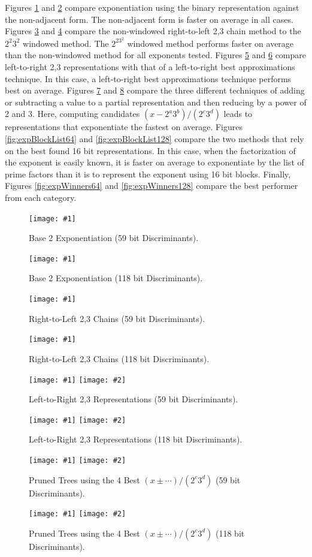 \documentclass{ucalgthes1}
\theoremstyle{definition}
\newcommand{\mygraph}[3]{
	\begin{figure}[htb]
	\centering
	\texttt{[image: \#1]}
	\caption{#3}
	\label{#2}
	\end{figure}
}
\newcommand{\mygraphTwo}[4]{
	\begin{figure}[htb]
	\centering
	\texttt{[image: \#1]}
	\texttt{[image: \#2]}
	\caption{#4}
	\label{#3}
	\end{figure}
}
\newcommand{\mygraphTwoX}[5]{
	\begin{figure}[htb]
	\centering
	\texttt{[image: \#1]}
	\texttt{[image: \#2]}
	\caption[#5]{#4}
	\label{#3}
	\end{figure}
}
\begin{document}
Figures \ref{fig:expBinNaf64} and \ref{fig:expBinNaf128} compare exponentiation using the binary representation against the non-adjacent form.  The non-adjacent form is faster on average in all cases.  Figures \ref{fig:expDbnsR2L64} and \ref{fig:expDbnsR2L128} compare the non-windowed right-to-left 2,3 chain method to the $2^2 3^2$ windowed method.  The $2^23^2$ windowed method performs faster on average than the non-windowed method for all exponents tested.  Figures \ref{fig:expDbnsL2R64} and \ref{fig:expDbnsL2R128} compare left-to-right 2,3 representations with that of a left-to-right best approximations technique.  In this case, a left-to-right best approximations technique performs best on average.  Figures \ref{fig:expPmVariants64} and \ref{fig:expPmVariants128} compare the three different techniques of adding or subtracting a value to a partial representation and then reducing by a power of 2 and 3.  Here, computing candidates $(x-2^a3^b)/(2^c3^d)$ leads to representations that exponentiate the fastest on average.  Figures \ref{fig:expBlockList64} and \ref{fig:expBlockList128} compare the two methods that rely on the best found 16 bit representations.  In this case, when the factorization of the exponent is easily known, it is faster on average to exponentiate by the list of prime factors than it is to represent the exponent using 16 bit blocks.  Finally, Figures \ref{fig:expWinners64} and \ref{fig:expWinners128} compare the best performer from each category.

\mygraph{binary_vs_naf-64}{fig:expBinNaf64}{Base 2 Exponentiation (59 bit Discriminants).}
\mygraph{binary_vs_naf-128}{fig:expBinNaf128}{Base 2 Exponentiation (118 bit Discriminants).}

\mygraph{dbns_r2ls-64}{fig:expDbnsR2L64}{Right-to-Left 2,3 Chains (59 bit Discriminants).}
\mygraph{dbns_r2ls-128}{fig:expDbnsR2L128}{Right-to-Left 2,3 Chains (118 bit Discriminants).}

\mygraphTwo{dbns_l2rs-64}{dbns_l2rs-64-zoom}{fig:expDbnsL2R64}{Left-to-Right 2,3 Representations (59 bit Discriminants).}
\mygraphTwo{dbns_l2rs-128}{dbns_l2rs-128-zoom}{fig:expDbnsL2R128}{Left-to-Right 2,3 Representations (118 bit Discriminants).}

\mygraphTwoX{pm_variants-64}{pm_variants-64-zoom}{fig:expPmVariants64}{Pruned Trees using the 4 Best $(x\pm\cdots)/(2^c3^d)$ (59 bit Discriminants).}{4 Best $(x\pm\cdots)/(2^c3^d)$ (59 bit Discriminants).}
\mygraphTwoX{pm_variants-128}{pm_variants-128-zoom}{fig:expPmVariants128}{Pruned Trees using the 4 Best $(x\pm\cdots)/(2^c3^d)$ (118 bit Discriminants).}{4 Best $(x\pm\cdots)/(2^c3^d)$ (118 bit Discriminants).}
\end{document}
